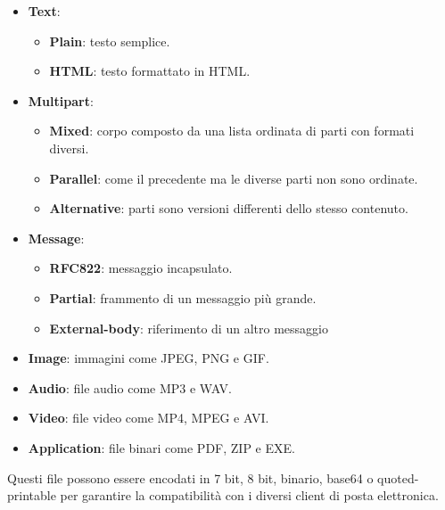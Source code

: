 \documentclass[12pt]{report}
\begin{document}
	\begin{itemize}
		\item \textbf{Text}: 
		\begin{itemize}
			\item \textbf{Plain}: testo semplice.
			\item \textbf{HTML}: testo formattato in HTML.
		\end{itemize}
		\item \textbf{Multipart}:
		\begin{itemize}
			\item \textbf{Mixed}: corpo composto da una lista ordinata di parti con formati diversi.
			\item \textbf{Parallel}: come il precedente ma le diverse parti non sono ordinate.
			\item \textbf{Alternative}: parti sono versioni differenti dello stesso contenuto.
		\end{itemize}
		\item \textbf{Message}:
		\begin{itemize}
			\item \textbf{RFC822}: messaggio incapsulato.
			\item \textbf{Partial}: frammento di un messaggio più grande.
			\item \textbf{External-body}: riferimento di un altro messaggio
		\end{itemize}
		\item \textbf{Image}: immagini come JPEG, PNG e GIF.
		\item \textbf{Audio}: file audio come MP3 e WAV.
		\item \textbf{Video}: file video come MP4, MPEG e AVI.
		\item \textbf{Application}: file binari come PDF, ZIP e EXE.
	\end{itemize}
	Questi file possono essere encodati in 7 bit, 8 bit, binario, base64 o quoted-printable per garantire la compatibilità con i diversi client di posta elettronica.
\end{document}
